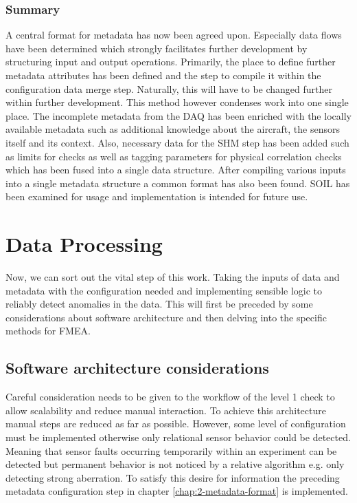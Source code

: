 \subsubsection{Summary}
A central format for metadata has now been agreed upon. Especially data flows have been determined which strongly facilitates further development by structuring input and output operations. Primarily, the place to define further metadata attributes has been defined and the step to compile it within the configuration data merge step. Naturally, this will have to be changed further within further development. This method however condenses work into one single place.
The incomplete metadata from the DAQ has been enriched with the locally available metadata such as additional knowledge about the aircraft, the sensors itself and its context. Also, necessary data for the SHM step has been added such as limits for checks as well as tagging parameters for physical correlation checks which has been fused into a single data structure.
After compiling various inputs into a single metadata structure a common format has also been found. SOIL has been examined for usage and implementation is intended for future use.

\newpage


\section{Data Processing}
Now, we can sort out the vital step of this work. Taking the inputs of data and metadata with the configuration needed and implementing sensible logic to reliably detect anomalies in the data. This will first be preceded by some considerations about software architecture and then delving into the specific methods for FMEA.

\subsection{Software architecture considerations}


Careful consideration needs to be given to the workflow of the level 1 check to allow scalability and reduce manual interaction. To achieve this architecture manual steps are reduced as far as possible. However, some level of configuration must be implemented otherwise only relational sensor behavior could be detected. Meaning that sensor faults occurring temporarily within an experiment can be detected but permanent behavior is not noticed by a relative algorithm e.g. only detecting strong aberration. To satisfy this desire for information the preceding metadata configuration step in chapter \ref{chap:2-metadata-format} is implemented.

